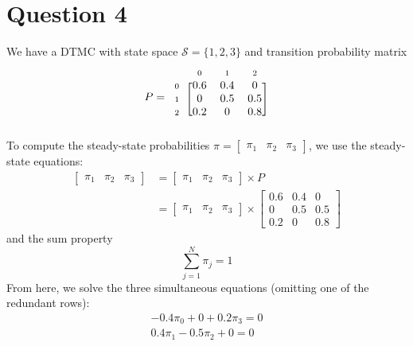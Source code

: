 \documentclass[12pt]{article}
\newcommand{\matindex}[1]{\mbox{\scriptsize#1}}%
\begin{document}
\section*{Question 4}

We have a DTMC with state space $\mathcal{S} = \{1,2,3\}$ and transition probability matrix \begin{equation}
    P = \begin{blockarray}{cccc}
        & \matindex{0} & \matindex{1} & \matindex{2} \\ 
        \begin{block}{c[ccc]}
            \matindex{0} & 0.6 & 0.4 & 0 \\ 
            \matindex{1} & 0 & 0.5 & 0.5 \\ 
            \matindex{2} & 0.2 & 0 & 0.8 \\ 
        \end{block}
    \end{blockarray}
\end{equation} To compute the steady-state probabilities $\pi = \begin{bmatrix}
    \pi_1 & \pi_2 & \pi_3
\end{bmatrix}$, we use the steady-state equations: \begin{align*}
    \begin{bmatrix}
        \pi_1 & \pi_2 & \pi_3
    \end{bmatrix} &= \begin{bmatrix}
        \pi_1 & \pi_2 & \pi_3
    \end{bmatrix} \times P \\ 
    &= \begin{bmatrix}
        \pi_1 & \pi_2 & \pi_3
    \end{bmatrix} \times \begin{bmatrix}
        0.6 & 0.4 & 0 \\ 
        0 & 0.5 & 0.5 \\ 
        0.2 & 0 & 0.8
    \end{bmatrix}
\end{align*} and the sum property \begin{equation*}
    \sum_{j=1}^{N} \pi_j = 1
\end{equation*} From here, we solve the three simultaneous equations (omitting one of the redundant rows): \begin{align}
    -0.4\pi_0 + 0 + 0.2\pi_3 = 0 \\ 
    0.4\pi_1 - 0.5 \pi_2 + 0 = 0 \\ 

\end{align}
\end{document}
